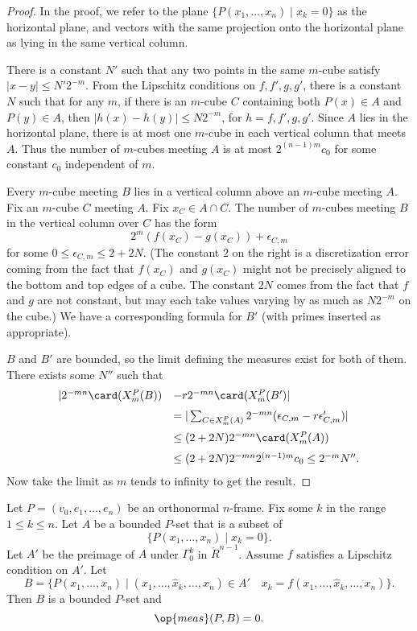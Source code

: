 \begin{proof}
In the proof, we refer to the plane $\{P(x_1,\ldots,x_n)\mid
x_k=0\}$ as the horizontal plane, and vectors with the same
projection onto the horizontal plane as lying in the same vertical
column.

There is a constant $N'$ such that any two points in the same
$m$-cube satisfy $|x-y|\le N' 2^{-m}$.  From the Lipschitz
conditions on $f,f',g,g'$, there is a constant $N$ such that for any
$m$, if there is an $m$-cube $C$ containing both $P(x)\in A$ and
$P(y)\in A$, then $|h(x)-h(y)|\le N 2^{-m}$, for $h=f,f',g,g'$.
Since $A$ lies in the horizontal plane, there is at most one
$m$-cube in each vertical column that meets $A$.  Thus the number of
$m$-cubes meeting $A$ is at most $2^{(n-1)m} c_0$ for some constant
$c_0$ independent of $m$.

Every $m$-cube meeting $B$ lies in a vertical column above an
$m$-cube meeting $A$.  Fix an $m$-cube $C$ meeting $A$. Fix $x_C\in
 A\cap C$.  The number of $m$-cubes meeting $B$ in the vertical column over
 $C$ has the form
    $$2^m (f(x_C) - g(x_C)) + \epsilon_{C,m}$$
for some $0\le \epsilon_{C,m}\le 2 + 2N$.  (The constant $2$ on the
right is a discretization error coming from the fact that $f(x_C)$
and $g(x_C)$ might not be precisely aligned to the bottom and top
edges of a cube.  The constant $2N$ comes from the fact that $f$ and
$g$ are not constant, but may each take values varying by as much as
$N 2^{-m}$ on the cube.)  We have a corresponding formula for $B'$
(with primes inserted as appropriate).

$B$ and $B'$ are bounded, so the limit defining the measures exist
for both of them.  There exists some $N''$ such that
    $$
    \begin{array}{lll}
    |2^{-m n}\card(X^P_m(B)) &- r 2^{-m n} \card(X^P_m(B')|
    \vspace{6pt}\\
    &= |\sum_{C\in X^P_m(A)} 2^{-m n} (\epsilon_{C,m} - r
    \epsilon'_{C,m})|
    \vspace{6pt}\\
    &\le (2+2N)2^{-m n}\card(X^P_m(A))
    \vspace{6pt}\\
    &\le (2+2N) 2^{-m n} 2^{(n-1)m} c_0 \le 2^{-m} N''.
    \end{array}
    $$
Now take the limit as $m$ tends to infinity to get the result.
\end{proof}

\begin{lemma}  Let $P = (v_0,e_1,\ldots,e_n)$ be an orthonormal $n$-frame. Fix
some $k$ in the range $1\le k\le n$. Let $A$ be a bounded $P$-set
that is a subset of
    $$\{P(x_1,\ldots,x_n) \mid x_k = 0\}.$$
Let $A'$ be the preimage of $A$ under $\Gamma^k_0$ in
$\ring{R}^{n-1}$.   Assume $f$ satisfies a Lipschitz condition on
$A'$. Let
    $$
    B=\{P(x_1,\ldots,x_n) \mid (x_1,\ldots,\hat x_k,\ldots,x_n) \in A'\quad
    x_k = f(x_1,\ldots,\hat x_k,\ldots,x_n)\}.
    $$
Then $B$ is a bounded $P$-set and
    $$\op{meas}(P,B) = 0.$$
\end{lemma}

